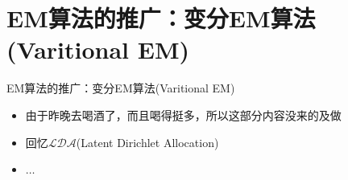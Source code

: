 \documentclass[noindent]{beamer}
\begin{document}
\section{EM算法的推广：变分EM算法(Varitional EM)}
\begin{frame}{EM算法的推广：变分EM算法(Varitional EM)}
\begin{itemize}
\pause
\item 由于昨晚去喝酒了，而且喝得挺多，所以这部分内容没来的及做
\item 回忆$\mathcal{LDA}$(Latent Dirichlet Allocation)
\item $\ldots$
\end{itemize}
\end{frame}
\end{document}
